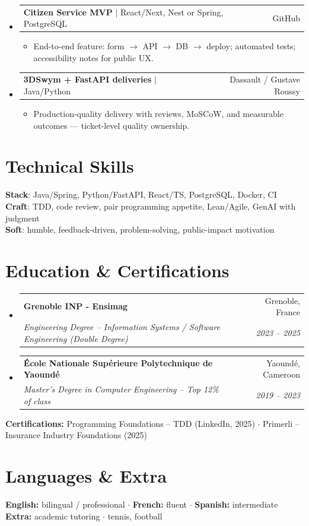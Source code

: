 \documentclass[letterpaper,10.5pt]{article}
\makeatletter
\newcommand{\resumeItem}[1]{\item\small{#1 \vspace{-1.5pt}}}
\newcommand{\resumeSubheading}[4]{
  \vspace{-1pt}\item
    \begin{tabular*}{0.97\textwidth}[t]{l@{\extracolsep{\fill}}r}
      \textbf{#1} & #2 \\
      \textit{\small#3} & \textit{\small #4} \\
    \end{tabular*}\vspace{-5pt}
}
\newcommand{\resumeProjectHeading}[2]{
    \item
    \begin{tabular*}{0.97\textwidth}{l@{\extracolsep{\fill}}r}
      \small#1 & #2 \\
    \end{tabular*}\vspace{-5pt}
}
\newcommand{\resumeSubHeadingListStart}{\begin{itemize}[leftmargin=0.15in, label={}]}
\newcommand{\resumeSubHeadingListEnd}{\end{itemize}}
\newcommand{\resumeItemListStart}{\begin{itemize}[leftmargin=0.18in]}
\newcommand{\resumeItemListEnd}{\end{itemize}\vspace{-3pt}}
\makeatother
\begin{document}
\resumeSubHeadingListStart
  \resumeProjectHeading
    {\textbf{Citizen Service MVP} $|$ React/Next, Nest or Spring, PostgreSQL}{GitHub}
    \resumeItemListStart
      \resumeItem{End-to-end feature: form $\rightarrow$ API $\rightarrow$ DB $\rightarrow$ deploy; automated tests; accessibility notes for public UX.}
    \resumeItemListEnd
  \resumeProjectHeading
    {\textbf{3DSwym + FastAPI deliveries} $|$ Java/Python}{Dassault / Gustave Roussy}
    \resumeItemListStart
      \resumeItem{Production-quality delivery with reviews, MoSCoW, and measurable outcomes --- ticket-level quality ownership.}
    \resumeItemListEnd
\resumeSubHeadingListEnd

\section{Technical Skills}

\begin{itemize}[leftmargin=0.15in, label={}]
  \small{\item{
\textbf{Stack}: Java/Spring, Python/FastAPI, React/TS, PostgreSQL, Docker, CI \\
\textbf{Craft}: TDD, code review, pair programming appetite, Lean/Agile, GenAI with judgment \\
\textbf{Soft}: humble, feedback-driven, problem-solving, public-impact motivation
  }}
\end{itemize}

\section{Education \& Certifications}

\resumeSubHeadingListStart
  \resumeSubheading
    {Grenoble INP - Ensimag}{Grenoble, France}
    {Engineering Degree -- Information Systems / Software Engineering (Double Degree)}{2023 -- 2025}
  \resumeSubheading
    {\'Ecole Nationale Sup\'erieure Polytechnique de Yaound\'e}{Yaound\'e, Cameroon}
    {Master's Degree in Computer Engineering -- Top 12\% of class}{2019 -- 2023}
\resumeSubHeadingListEnd
\small{
\textbf{Certifications:} Programming Foundations -- TDD (LinkedIn, 2025) $\cdot$ Primerli -- Insurance Industry Foundations (2025)
}

\section{Languages \& Extra}
\small{
\textbf{English:} bilingual / professional $\cdot$ \textbf{French:} fluent $\cdot$ \textbf{Spanish:} intermediate \\
\textbf{Extra:} academic tutoring $\cdot$ tennis, football
}
\end{document}
